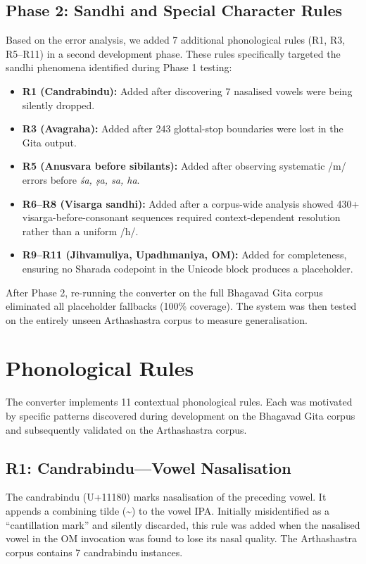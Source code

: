 \documentclass[11pt]{article}
\begin{document}
\subsection{Phase 2: Sandhi and Special Character Rules}
Based on the error analysis, we added 7 additional phonological rules (R1, R3, R5--R11) in a second development phase. These rules specifically targeted the sandhi phenomena identified during Phase 1 testing:

\begin{itemize}
    \item \textbf{R1 (Candrabindu):} Added after discovering 7 nasalised vowels were being silently dropped.
    \item \textbf{R3 (Avagraha):} Added after 243 glottal-stop boundaries were lost in the Gita output.
    \item \textbf{R5 (Anusvara before sibilants):} Added after observing systematic /m/ errors before \textit{\'{s}a, \d{s}a, sa, ha}.
    \item \textbf{R6--R8 (Visarga sandhi):} Added after a corpus-wide analysis showed 430+ visarga-before-consonant sequences required context-dependent resolution rather than a uniform /h/.
    \item \textbf{R9--R11 (Jihvamuliya, Upadhmaniya, OM):} Added for completeness, ensuring no Sharada codepoint in the Unicode block produces a placeholder.
\end{itemize}

After Phase 2, re-running the converter on the full Bhagavad Gita corpus eliminated all placeholder fallbacks (100\% coverage). The system was then tested on the entirely unseen Arthashastra corpus to measure generalisation.

\section{Phonological Rules}

The converter implements 11 contextual phonological rules. Each was motivated by specific patterns discovered during development on the Bhagavad Gita corpus and subsequently validated on the Arthashastra corpus.

\subsection{R1: Candrabindu---Vowel Nasalisation}
The candrabindu (U+11180) marks nasalisation of the preceding vowel. It appends a combining tilde (\~{}) to the vowel IPA. Initially misidentified as a ``cantillation mark'' and silently discarded, this rule was added when the nasalised vowel in the OM invocation was found to lose its nasal quality. The Arthashastra corpus contains 7 candrabindu instances.
\end{document}
